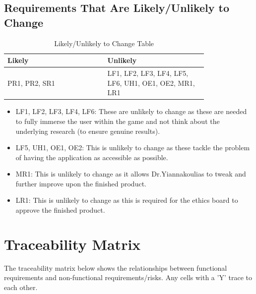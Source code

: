 \documentclass{article}
\begin{document}
\subsection{Requirements That Are Likely/Unlikely to Change}
\begin{table}[h]
    \centering
    \begin{tabular}{|p{0.40\linewidth} | p{0.40\linewidth}|}
    \hline
         Likely & Unlikely \\
         \hline
         PR1, PR2, SR1 & LF1, LF2, LF3, LF4, LF5, LF6, UH1, OE1, OE2, MR1, LR1      \\
         \hline
    \end{tabular}
    \caption{Likely/Unlikely to Change Table}
    \label{tab:my_label}
\end{table}
\begin{itemize}
    \item LF1, LF2, LF3, LF4, LF6: These are unlikely to change as these are needed to fully immerse the user within the game and not think about the underlying research (to ensure genuine results).
    \item LF5, UH1, OE1, OE2: This is unlikely to change as these tackle the problem of having the application as accessible as possible.
    \item MR1: This is unlikely to change as it allows Dr.Yiannakoulias to tweak and further improve upon the finished product.
    \item LR1: This is unlikely to change as this is required for the ethics board to approve the finished product.
    
\end{itemize}
\section{Traceability Matrix}

The traceability matrix below shows the relationships between functional requirements and non-functional requirements/risks. Any cells with a 'Y' trace to each other. 
\end{document}
